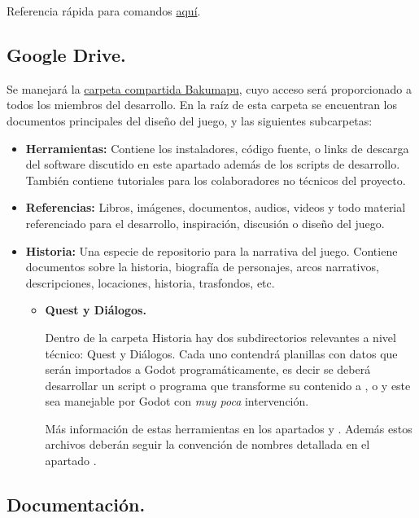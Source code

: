 Referencia rápida para comandos  \href{https://rogerdudler.github.io/git-guide}{aquí}.

\subsection{Google Drive.}\label{flujo:google-drive}
Se manejará la \href{https://drive.google.com/open?id=1p8u-1UpXts8OHGRHEZLSIiQrqqx0Y4Kt}{carpeta compartida Bakumapu}, cuyo acceso será proporcionado a todos los miembros del desarrollo. En la raíz de esta carpeta se encuentran los documentos principales del diseño del juego, y las siguientes subcarpetas:
\begin{itemize}
	\item \textbf{Herramientas:} Contiene los instaladores, código fuente, o links de descarga del software discutido en este apartado además de los scripts de desarrollo. También contiene tutoriales para los colaboradores no técnicos del proyecto.
	\item \textbf{Referencias:} Libros, imágenes, documentos, audios, videos y todo material referenciado para el desarrollo, inspiración, discusión o diseño del juego.
	\item \textbf{Historia:} Una especie de repositorio para la narrativa del juego. Contiene documentos sobre la historia, biografía de personajes, arcos narrativos, descripciones, locaciones, historia, trasfondos, etc.
	\begin{itemize}
		\item \textbf{Quest y Diálogos.}
		
		Dentro de la carpeta Historia hay dos subdirectorios relevantes a nivel técnico: Quest y Diálogos. Cada uno contendrá planillas con datos que serán importados a Godot programáticamente, es decir se deberá desarrollar un script o programa que transforme su contenido a ,  o  y este sea manejable por Godot con \emph{muy poca} intervención.
		
		Más información de estas herramientas en los apartados  y . Además estos archivos deberán seguir la convención de nombres detallada en el apartado .
	\end{itemize}
\end{itemize}

\subsection{Documentación.}\label{flujo:documentacion}


